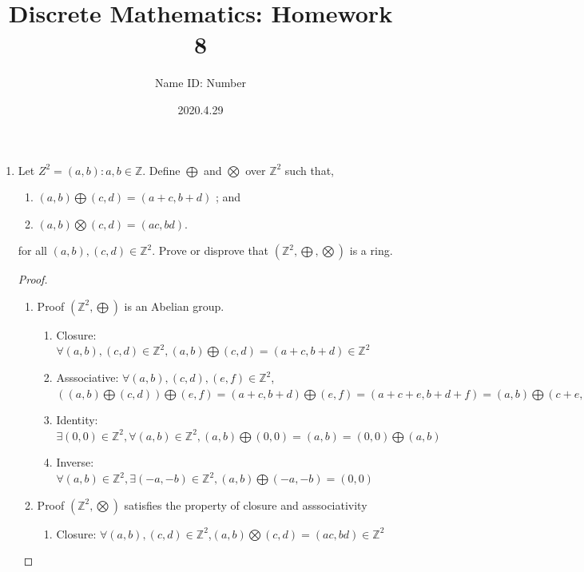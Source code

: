 \documentclass{article}
\title{Discrete Mathematics:  Homework 8}
\author{Name  \quad  \quad ID: Number}
\date{2020.4.29}
\theoremstyle{break}
\begin{document}
\maketitle
\begin{enumerate}
        \item Let $Z^2= {(a, b) :a, b\in \mathbb{Z}}$.  Define $\bigoplus$ and $\bigotimes$ over $\mathbb{Z}^2$ such that,
        \begin{enumerate}
                \item $(a, b)\bigoplus(c, d) = (a+c, b+d)$ ; and
                \item  $(a, b)\bigotimes(c, d) = (ac, bd)$.
        \end{enumerate}
        for all $(a, b),(c, d)\in \mathbb{Z}^2$.  Prove or disprove that $(\mathbb{Z}^2,\bigoplus,\bigotimes)$ is a ring.
        \begin{proof}
                \leavevmode\\
                \begin{enumerate}
                        \item Proof $(\mathbb{Z}^2,\bigoplus)$ is an Abelian group.
                        \begin{enumerate}
                                \item Closure: $\forall (a,b) , (c,d)\in \mathbb{Z}^2, (a, b)\bigoplus(c, d) = (a+c, b+d) \in \mathbb{Z}^2$
                                \item Asssociative: $\forall (a,b) , (c,d), (e,f)\in \mathbb{Z}^2$, \\$((a, b)\bigoplus(c, d) )\bigoplus (e,f)=(a+c, b+d) \bigoplus (e,f) = (a+c+e, b+d+f) = (a,b) \bigoplus (c+e, d+f)=(a, b)\bigoplus((c, d) \bigoplus (e,f))$
                                \item Identity: $\exists (0,0) \in \mathbb{Z}^2, \forall (a,b) \in \mathbb{Z}^2, (a,b)\bigoplus(0,0) = (a,b) = (0,0) \bigoplus (a,b)$
                                \item Inverse: $\forall (a,b) \in \mathbb{Z}^2, \exists(-a,-b) \in \mathbb{Z}^2, (a,b) \bigoplus (-a,-b) = (0,0)$
                        \end{enumerate}
                        \item Proof $(\mathbb{Z}^2,\bigotimes)$ satisfies the property of closure and asssociativity
                        \begin{enumerate}
                                \item Closure: $\forall (a, b),(c, d)\in \mathbb{Z}^2$,$(a, b)\bigotimes(c, d) = (ac, bd) \in \mathbb{Z}^2$

\end{enumerate}
\end{enumerate}
\end{proof}
\end{enumerate}
\end{document}
